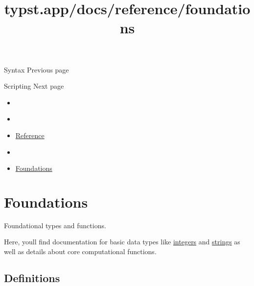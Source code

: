 \href{/docs/reference/syntax/}{\pandocbounded{}}

{ Syntax } { Previous page }

\href{/docs/reference/scripting/}{\pandocbounded{}}

{ Scripting } { Next page }


\title{typst.app/docs/reference/foundations}

\begin{itemize}
\tightlist
\item
  \href{/docs}{}
\item
  
\item
  \href{/docs/reference/}{Reference}
\item
  
\item
  \href{/docs/reference/foundations/}{Foundations}
\end{itemize}

\section{Foundations}\label{summary}

Foundational types and functions.

Here, you\textquotesingle ll find documentation for basic data types
like \href{/docs/reference/foundations/int/}{integers} and
\href{/docs/reference/foundations/str/}{strings} as well as details
about core computational functions.

\subsection{Definitions}\label{definitions}

